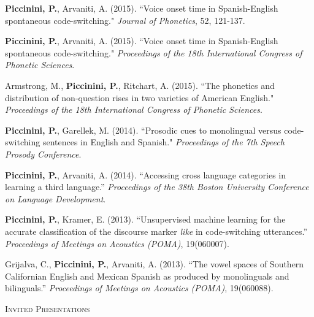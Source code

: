 \documentclass[9pt]{article}
\newenvironment{changemargin}[2]{%
  \begin{list}{}{%
    \setlength{\topsep}{0pt}%
    \setlength{\leftmargin}{#1}%
    \setlength{\rightmargin}{#2}%
    \setlength{\listparindent}{\parindent}%
    \setlength{\itemindent}{\parindent}%
    \setlength{\parsep}{\parskip}%
  }%
  \item[]}{\end{list}
}
\newcommand{\lineover}{
	\begin{changemargin}{-0.05in}{-0.05in}
		\vspace*{-8pt}
		\hrulefill \\
		\vspace*{-2pt}
	\end{changemargin}
}
\newcommand{\header}[1]{
	\begin{changemargin}{-0.5in}{-0.5in}
		\scshape{#1}\\
  	\lineover
	\end{changemargin}
}
\newenvironment{body} {
	\vspace*{-16pt}
	\begin{changemargin}{-0.25in}{-0.5in}
  }	
	{\end{changemargin}
}
\begin{document}
\begin{body}
	\textbf{Piccinini, P.}, Arvaniti, A. (2015). ``Voice onset time in Spanish-English spontaneous code-switching." \emph{Journal of Phonetics}, 52, 121-137.\\
	\medskip

	\textbf{Piccinini, P.}, Arvaniti, A. (2015). ``Voice onset time in Spanish-English spontaneous code-switching." \emph{Proceedings of the 18th International Congress of Phonetic Sciences}.\\
	\medskip
	
	Armstrong, M., \textbf{Piccinini, P.}, Ritchart, A. (2015). ``The phonetics and distribution of non-question rises in two varieties of American English." \emph{Proceedings of the 18th International Congress of Phonetic Sciences}.\\
	\medskip
	
	\textbf{Piccinini, P.}, Garellek, M. (2014). ``Prosodic cues to monolingual versus code-switching sentences in English and Spanish." \emph{Proceedings of the 7th Speech Prosody Conference}.\\
	\medskip
	
	\textbf{Piccinini, P.}, Arvaniti, A. (2014). ``Accessing cross language categories in learning a third language.'' \emph{Proceedings of the 38th Boston University Conference on Language Development}.\\
	 \medskip

	\textbf{Piccinini, P.}, Kramer, E. (2013). ``Unsupervised machine learning for the accurate classification of the discourse marker \emph{like} in code-switching utterances.'' \emph{Proceedings of Meetings on Acoustics (POMA)}, 19(060007).\\
	 \medskip
	
	Grijalva, C., \textbf{Piccinini, P.}, Arvaniti, A. (2013). ``The vowel spaces of Southern Californian English and Mexican Spanish as produced by monolinguals and bilinguals.'' \emph{Proceedings of Meetings on Acoustics (POMA)}, 19(060088).\\
\end{body}

\smallskip


\header{Invited Presentations}
\end{document}
